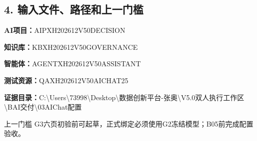 \documentclass[UTF8,openany,zihao=-4]{ctexbook}
\renewcommand{\_}{\textunderscore\allowbreak}
\begin{document}
\subsection*{4. 输入文件、路径和上一门槛}
\noindent\textbf{AI项目：}{\promptlatin\promptcjk\small AIP\_\allowbreak{}XH202612\_\allowbreak{}V50\_\allowbreak{}DECISION}\par
\noindent\textbf{知识库：}{\promptlatin\promptcjk\small KB\_\allowbreak{}XH202612\_\allowbreak{}V50\_\allowbreak{}GOVERNANCE}\par
\noindent\textbf{智能体：}{\promptlatin\promptcjk\small AGENT\_\allowbreak{}XH202612\_\allowbreak{}V50\_\allowbreak{}ASSISTANT}\par
\noindent\textbf{测试资源：}{\promptlatin\promptcjk\small QA\_\allowbreak{}XH202612\_\allowbreak{}V50\_\allowbreak{}AICHAT\_\allowbreak{}25}\par
\noindent\textbf{证据目录：}{\promptlatin\promptcjk\small C:\textbackslash{}\allowbreak{}Users\textbackslash{}\allowbreak{}73998\textbackslash{}\allowbreak{}Desktop\textbackslash{}\allowbreak{}数据创新平台-\allowbreak{}张奥\textbackslash{}\allowbreak{}V5.0\_\allowbreak{}双人执行工作区\textbackslash{}\allowbreak{}B\_\allowbreak{}AI交付\textbackslash{}\allowbreak{}03\_\allowbreak{}AIChat配置}\par
\begin{gatebox}{上一门槛}
G3六页初验前可起草，正式绑定必须使用G2冻结模型；B05前完成配置验收。

\end{gatebox}
\end{document}
